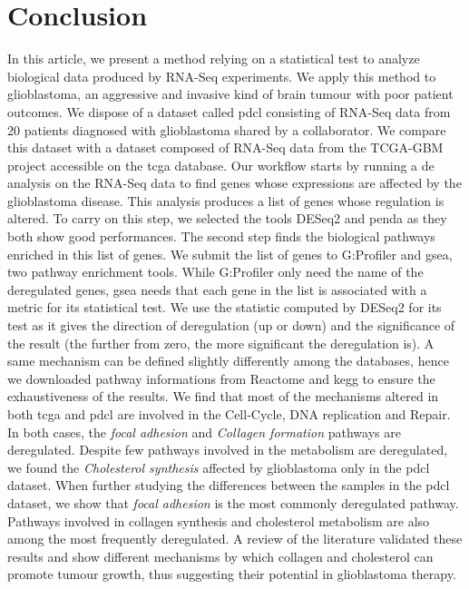 \section{Conclusion}

In this article, we present a method relying on a statistical test to analyze biological data produced by RNA-Seq experiments.
We apply this method to glioblastoma, an aggressive and invasive kind of brain tumour with poor patient outcomes.
We dispose of a dataset called \acrshort{pdcl} consisting of RNA-Seq data from 20 patients diagnosed with glioblastoma shared by a collaborator.
We compare this dataset with a dataset composed of RNA-Seq data from the TCGA-GBM project accessible on the \acrshort{tcga} database.
Our workflow starts by running a \acrlong{de} analysis on the RNA-Seq data to find genes whose expressions are affected by the glioblastoma disease.
This analysis produces a list of genes whose regulation is altered.
To carry on this step, we selected the tools DESeq2 and \acrshort{penda} as they both show good performances.
The second step finds the biological pathways enriched in this list of genes.
We submit the list of genes to G:Profiler and \acrshort{gsea}, two pathway enrichment tools.
While G:Profiler only need the name of the deregulated genes, \acrshort{gsea} needs that each gene in the list is associated with a metric for its statistical test.
We use the statistic computed by DESeq2 for its test as it gives the direction of deregulation (up or down) and the significance of the result (the further from zero, the more significant the deregulation is).
A same mechanism can be defined slightly differently among the databases, hence we downloaded pathway informations from Reactome and \acrshort{kegg} to ensure the exhaustiveness of the results.
We find that most of the mechanisms altered in both \acrshort{tcga} and \acrshort{pdcl} are involved in the Cell-Cycle, DNA replication and Repair.
In both cases, the \textit{focal adhesion} and \textit{Collagen formation} pathways are deregulated.
Despite few pathways involved in the metabolism are deregulated, we found the \textit{Cholesterol synthesis} affected by glioblastoma only in the \acrshort{pdcl} dataset.
When further studying the differences between the samples in the \acrshort{pdcl} dataset, we show that \textit{focal adhesion} is the most commonly deregulated pathway.
Pathways involved in collagen synthesis and cholesterol metabolism are also among the most frequently deregulated.
A review of the literature validated these results and show different mechanisms by which collagen and cholesterol can promote tumour growth, thus suggesting their potential in glioblastoma therapy.